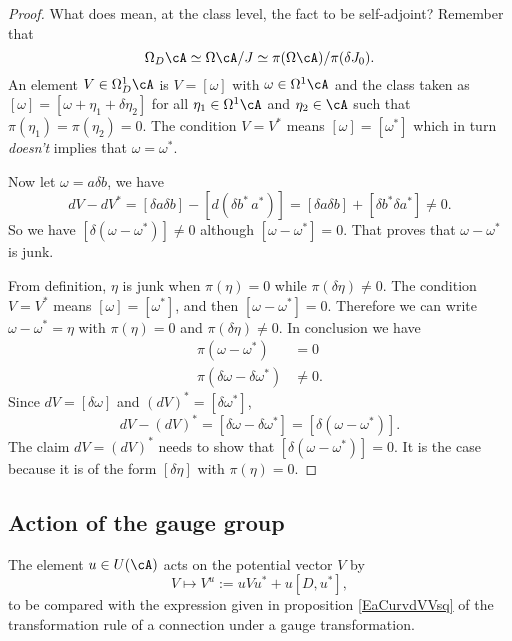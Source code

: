 \begin{proof}
	What does mean, at the class level, the fact to be self-adjoint? Remember that
	\[
		\Omega_D\cA\simeq \Omega\cA/J\simeq\pi(\Omega\cA)/\pi(\delta J_0).
	\]
	An element $V\in\Omega_D^1\cA$ is $V=[\omega]$ with $\omega\in\Omega^1\cA$ and the class taken as $[\omega]=[\omega+\eta_1+\delta\eta_2]$ for all $\eta_1\in\Omega^1\cA$ and $\eta_2\in\cA$ such that $\pi(\eta_1)=\pi(\eta_2)=0$. The condition $V=V^*$ means $[\omega]=[\omega^*]$ which in turn \emph{doesn't} implies that $\omega=\omega^*$.

	Now let $\omega=a\delta b$, we have
	\[
		dV-dV^*=[\delta a\delta b]-[d(\delta b^*\, a^*)]
		=[\delta a\delta b]+[\delta b^*\delta a^*]\neq 0.
	\]
	So we have $[\delta(\omega-\omega^*)]\neq 0$ although $[\omega-\omega^*]=0$. That proves that $\omega-\omega^*$ is junk.

	From definition, $\eta$ is junk when $\pi(\eta)=0$ while $\pi(\delta\eta)\neq 0$. The condition $V=V^*$ means $[\omega]=[\omega^*]$, and then $[\omega-\omega^*]=0$. Therefore we can write $\omega-\omega^*=\eta$ with $\pi(\eta)=0$ and $\pi(\delta\eta)\neq 0$. In conclusion we have
	\begin{subequations}
		\begin{align}
			\pi(\omega-\omega^*)             & =0      \\
			\pi(\delta\omega-\delta\omega^*) & \neq 0.
		\end{align}
	\end{subequations}
	Since $dV=[\delta\omega]$ and $(dV)^*=[\delta\omega^*]$,
	\[
		dV-(dV)^*=[\delta\omega-\delta\omega^*]
		=[\delta(\omega-\omega^*)].
	\]
	The claim $dV=(dV)^*$ needs to show that $[\delta(\omega-\omega^*)]=0$. It is the case because it is of the form $[\delta\eta]$ with $\pi(\eta)=0$.

\end{proof}


\subsection{Action of the gauge group}

The element $u\in U(\cA)$ acts on the potential vector $V$ by
\begin{equation}	\label{EqDefActGaugePotVec}
	V\mapsto V^{u}:=uVu^*+u[D,u^*],
\end{equation}
to be compared with the expression given in proposition \eqref{EaCurvdVVsq} of the transformation rule of a connection under a gauge transformation.

